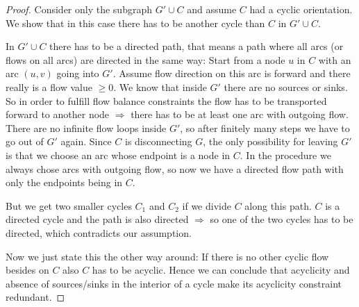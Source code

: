 \begin{proof}
 Consider only the subgraph $G'\cup C$ and assume $C$ had a cyclic orientation. We show that in this case there has to 
be another cycle than $C$ in $G'\cup C$.

In $G'\cup C$ there has to be a directed path, that means a path where all arcs (or flows on all arcs) are directed in 
the same way: Start from a node $u$ in $C$ with an arc $(u,v)$ going into $G'$. Assume flow direction on this arc is 
forward and there really is a flow value $\ge 0$. We know that inside $G'$ there are no sources or sinks. So in order 
to fulfill flow balance constraints the flow has to be transported forward to another node $\Rightarrow$ there has to 
be at least one arc with outgoing flow. There are no infinite flow loops inside $G'$, so after finitely many 
steps we have to go out of $G'$ again. Since $C$ is disconnecting $G$, the only possibility for leaving $G'$ is that we 
choose an arc whose endpoint is a node in $C$. In the procedure we always chose arcs with outgoing flow, so now we have 
a directed flow path with only the endpoints being in $C$. 

But we get two smaller cycles $C_1$ and $C_2$ if we divide $C$ along this path. $C$ is a directed cycle and the path 
is also directed $\Rightarrow$ so one of the two cycles has to be directed, which contradicts our assumption. 
\Lightning 

Now we just state this the other way around: If there is no other cyclic flow besides on $C$ also $C$ has to be acyclic.
Hence we can conclude that acyclicity and absence of sources/sinks in the interior of a cycle make its acyclicity 
constraint redundant.
\end{proof}

